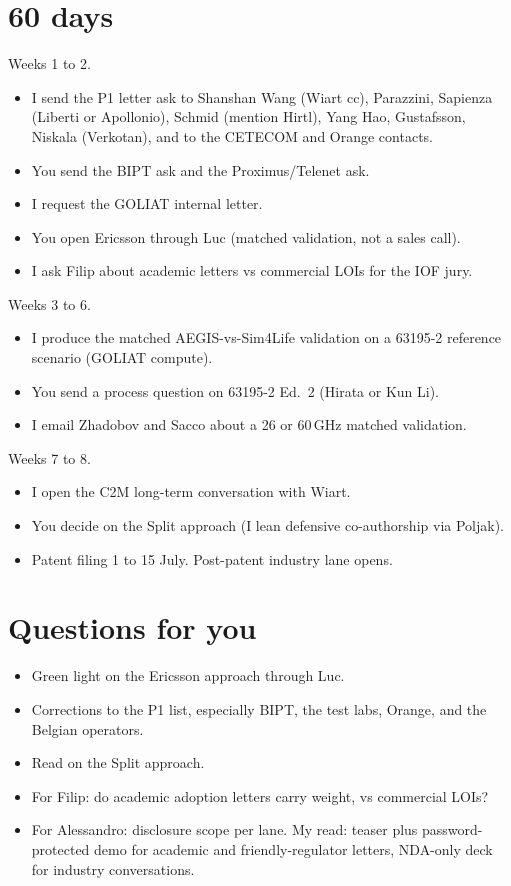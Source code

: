 \documentclass[11pt,a4paper]{article}
\begin{document}
\section{60 days}
Weeks 1 to 2.
\begin{itemize}
  \item I send the P1 letter ask to Shanshan Wang (Wiart cc), Parazzini, Sapienza (Liberti or Apollonio), Schmid (mention Hirtl), Yang Hao, Gustafsson, Niskala (Verkotan), and to the CETECOM and Orange contacts.
  \item You send the BIPT ask and the Proximus/Telenet ask.
  \item I request the GOLIAT internal letter.
  \item You open Ericsson through Luc (matched validation, not a sales call).
  \item I ask Filip about academic letters vs commercial LOIs for the IOF jury.
\end{itemize}

Weeks 3 to 6.
\begin{itemize}
  \item I produce the matched AEGIS-vs-Sim4Life validation on a 63195-2 reference scenario (GOLIAT compute).
  \item You send a process question on 63195-2 Ed.\ 2 (Hirata or Kun Li).
  \item I email Zhadobov and Sacco about a 26 or 60\,GHz matched validation.
\end{itemize}

Weeks 7 to 8.
\begin{itemize}
  \item I open the C2M long-term conversation with Wiart.
  \item You decide on the Split approach (I lean defensive co-authorship via Poljak).
  \item Patent filing 1 to 15 July. Post-patent industry lane opens.
\end{itemize}

\section{Questions for you}
\begin{itemize}
  \item Green light on the Ericsson approach through Luc.
  \item Corrections to the P1 list, especially BIPT, the test labs, Orange, and the Belgian operators.
  \item Read on the Split approach.
  \item For Filip: do academic adoption letters carry weight, vs commercial LOIs?
  \item For Alessandro: disclosure scope per lane. My read: teaser plus password-protected demo for academic and friendly-regulator letters, NDA-only deck for industry conversations.
\end{itemize}
\end{document}
